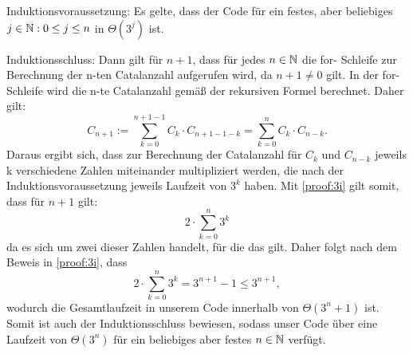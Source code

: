 \documentclass{scrartcl} %
\begin{document}
\begin{aufgabe}
\begin{enumerate}[label=(\alph*)]
            Induktionsvoraussetzung: Es gelte, dass der Code für ein festes, aber beliebiges $j \in \operatorname{\mathbb N}: 0 \leq j \leq n$ in $\Theta(3^j)$ ist.
            
            Induktionsschluss: Dann gilt für $n+1$, dass für jedes $n \in \operatorname{\mathbb N}$ die for- Schleife zur Berechnung der n-ten Catalanzahl aufgerufen wird, da $n+1 \neq 0$ gilt. In der for-Schleife wird die n-te Catalanzahl gemäß der rekursiven Formel berechnet. Daher gilt:
            \[
                C_{n+1}:=\sum_{k=0}^{n+1-1}C_k \cdot C_{n+1-1-k}= \sum_{k=0}^{n}C_k \cdot C_{n-k}.
            \] 
            Daraus ergibt sich, dass zur Berechnung der Catalanzahl für $C_k$ und $C_{n-k}$ jeweils k verschiedene Zahlen miteinander multipliziert werden, die nach der Induktionsvoraussetzung jeweils Laufzeit von $3^k$ haben. Mit \ref{proof:3i} gilt somit, dass für $n+1$ gilt: 
            \[
                2 \cdot \sum_{k=0}^n 3^k
            \]
            da es sich um zwei dieser Zahlen handelt, für die das gilt. Daher folgt nach dem Beweis in \ref{proof:3i}, dass 
            \[
                2 \cdot \sum_{k=0}^n 3^k = 3^{n+1} -1 \leq 3^{n+1},
            \] 
            wodurch die Gesamtlaufzeit in unserem Code innerhalb von $\Theta (3^n+1)$ ist. Somit ist auch der Induktionsschluss bewiesen, sodass unser Code über eine Laufzeit von $\Theta(3^n)$ für ein beliebiges aber festes $n \in \operatorname{\mathbb N}$ verfügt.
        \end{enumerate}
    \end{aufgabe}
\end{document}
